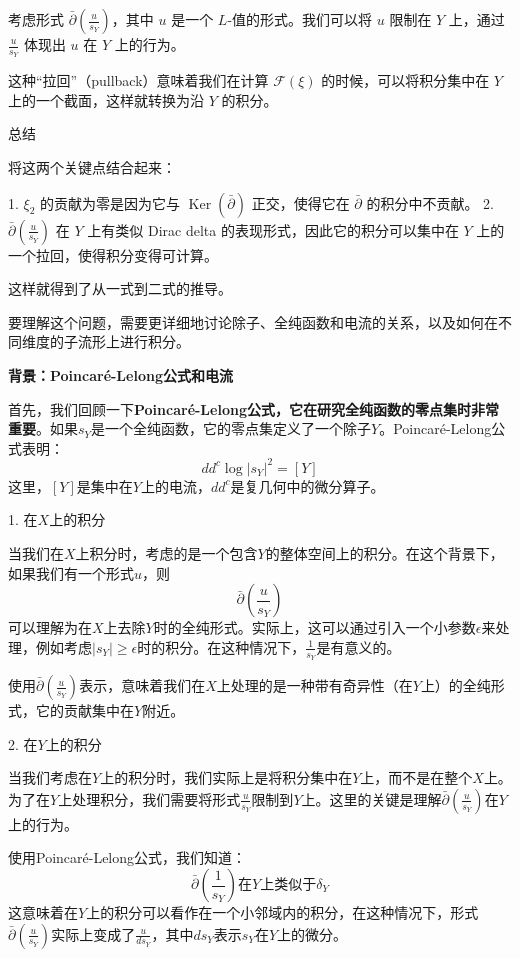 \begin{remark}
\begin{itemize}
考虑形式 $\bar{\partial}\left(\frac{u}{s_Y}\right)$，其中 $u$ 是一个 $L$-值的形式。我们可以将 $u$ 限制在 $Y$ 上，通过 $\frac{u}{s_Y}$ 体现出 $u$ 在 $Y$ 上的行为。

这种“拉回”（pullback）意味着我们在计算 $\mathcal{F}(\xi)$ 的时候，可以将积分集中在 $Y$ 上的一个截面，这样就转换为沿 $Y$ 的积分。
\end{itemize}

总结

将这两个关键点结合起来：

1. $\xi_2$ 的贡献为零是因为它与 $\operatorname{Ker}(\bar{\partial})$ 正交，使得它在 $\bar{\partial}$ 的积分中不贡献。
2. $\bar{\partial}\left(\frac{u}{s_Y}\right)$ 在 $Y$ 上有类似 Dirac delta 的表现形式，因此它的积分可以集中在 $Y$ 上的一个拉回，使得积分变得可计算。

这样就得到了从一式到二式的推导。

\Line
要理解这个问题，需要更详细地讨论除子、全纯函数和电流的关系，以及如何在不同维度的子流形上进行积分。

\textbf{背景：Poincaré-Lelong公式和电流}

首先，我们回顾一下\textbf{Poincaré-Lelong公式，它在研究全纯函数的零点集时非常重要}。如果$s_Y$是一个全纯函数，它的零点集定义了一个除子$Y$。Poincaré-Lelong公式表明：
$$
dd^c \log |s_Y|^2 = [Y]
$$
这里，$[Y]$是集中在$Y$上的电流，$dd^c$是复几何中的微分算子。

1. 在$X$上的积分

当我们在$X$上积分时，考虑的是一个包含$Y$的整体空间上的积分。在这个背景下，如果我们有一个形式$u$，则
$$
\bar{\partial} \left(\frac{u}{s_Y}\right)
$$
可以理解为在$X$上去除$Y$时的全纯形式。实际上，这可以通过引入一个小参数$\epsilon$来处理，例如考虑$|s_Y| \geq \epsilon$时的积分。在这种情况下，$\frac{1}{s_Y}$是有意义的。

使用$\bar{\partial} \left(\frac{u}{s_Y}\right)$表示，意味着我们在$X$上处理的是一种带有奇异性（在$Y$上）的全纯形式，它的贡献集中在$Y$附近。

2. 在$Y$上的积分

当我们考虑在$Y$上的积分时，我们实际上是将积分集中在$Y$上，而不是在整个$X$上。为了在$Y$上处理积分，我们需要将形式$\frac{u}{s_Y}$限制到$Y$上。这里的关键是理解$\bar{\partial}\left(\frac{u}{s_Y}\right)$在$Y$上的行为。

使用Poincaré-Lelong公式，我们知道：
$$
\bar{\partial}\left(\frac{1}{s_Y}\right) \text{在} Y \text{上类似于} \delta_Y
$$
这意味着在$Y$上的积分可以看作在一个小邻域内的积分，在这种情况下，形式$\bar{\partial}\left(\frac{u}{s_Y}\right)$实际上变成了$\frac{u}{ds_Y}$，其中$ds_Y$表示$s_Y$在$Y$上的微分。


\end{remark}
